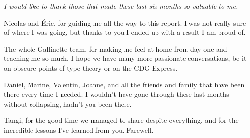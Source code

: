 \documentclass{kaobook}
\DeclareMathOperator{\?}{?}
\begin{document}
{\thispagestyle{empty}
{\itshape\noindent\small
	I would like to thank those that made these last six months so valuable to me.
	
	Nicolas and Éric, for guiding me all the way to this report. I was not really sure of where I was going, but thanks to you I ended up with a result I am proud of.
	
	The whole Gallinette team, for making me feel at home from day one and teaching me so much. I hope we have many more passionate conversations, be it on obscure points of type theory or on the CDG Express.
	
	Daniel, Marine, Valentin, Joanne, and all the friends and family that have been there every time I needed. I wouldn't have gone through these last months without collapsing, hadn't you been there.
	
	Tangi, for the good time we managed to share despite everything, and for the incredible lessons I've learned from you. Farewell.
}
\cleardoublepage\setcounter{page}{1}




%	
%	

}
\end{document}
